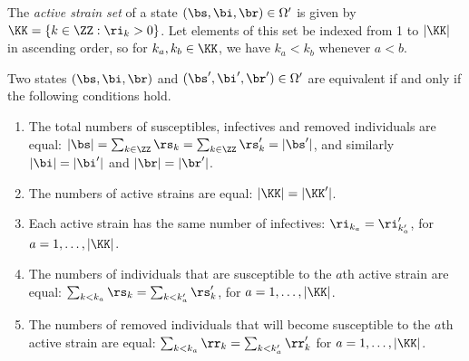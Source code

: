\documentclass[smallextended]{svjour3}       %
\begin{document}
\begin{mydef}
	The \emph{active strain set} of a state $(\bs, \bi, \br) \in \Omega'$ is given by $\KK = \{k \in \ZZ : \ri_k > 0\}$. Let elements of this set be indexed from 1 to $|\KK|$ in ascending order, so for $k_a, k_b \in \KK$, we have $k_a < k_b$ whenever $a < b$.
\end{mydef}
\begin{mydef}\label{def: equiv}
	Two states $(\bs,\bi,\br)$ and $(\bs', \bi', \br') \in \Omega'$ are equivalent if and only if the following conditions hold.
	\begin{enumerate}
		\item The total numbers of susceptibles, infectives and removed individuals are equal: $|\bs| = \sum_{k\in \ZZ} \rs_k = \sum_{k\in\ZZ} \rs'_k = |\bs'|$, and similarly $|\bi| = |\bi'|$ and $|\br| = |\br'|$.
		\item The numbers of active strains are equal: $|\KK| = |\KK'|$.

		\item Each active strain has the same number of infectives: $\ri_{k_a} = \ri'_{k'_a}$, for $a = 1, \dots, |\KK|$.
		\item The numbers of individuals that are susceptible to the $a$th active strain are equal: $\sum_{k < k_a} \rs_k = \sum_{k < k'_a} \rs'_k$, for $a = 1, \dots, |\KK|$. 
		\item The numbers of removed individuals that will become susceptible to the $a$th active strain are equal: $\sum_{k < k_a} \rr_k = \sum_{k < k'_a} \rr'_k$ for $a = 1, \dots, |\KK|$.
	\end{enumerate}
\end{mydef}
\end{document}
